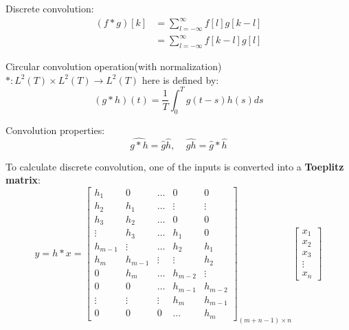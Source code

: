 \documentclass[12pt]{article}
\numberwithin{equation}{section}
\begin{document}
Discrete convolution: 
\begin{align}
	(f * g)[k] &= \sum_{l=-\infty}^\infty f[l] g[k - l] \\
			&= \sum_{l=-\infty}^\infty f[k-l] g[l]
\end{align} \par

Circular convolution operation(with normalization) $*:L^2(T) \times L^2(T) \rightarrow L^2(T)$ here is defined by:
\begin{equation} \label{eq:circonv}
	 (g * h)(t) = \frac{1}{T} \int^{T}_{0} g(t-s) h(s) ds
\end{equation} \par
Convolution properties: 
\begin{equation}\label{eq:convprop}
	 \widehat{g*h}=\hat{g}\hat{h},\ \ \ \ \  \widehat{gh}=\hat{g}*\hat{h}
\end{equation} \par
To calculate discrete convolution, one of the inputs is converted into a \textbf{Toeplitz matrix}:
\begin{equation} \label{eq:convToep}
 y = h \ast x =
            \begin{bmatrix}
                h_1 & 0 & \ldots & 0 & 0 \\
                h_2 & h_1 & \ldots & \vdots & \vdots \\
                h_3 & h_2 & \ldots & 0 & 0 \\
                \vdots & h_3 & \ldots & h_1 & 0 \\
                h_{m-1} & \vdots & \ldots & h_2 & h_1 \\
                h_m & h_{m-1} & \vdots & \vdots & h_2 \\
                0 & h_m & \ldots & h_{m-2} & \vdots \\
                0 & 0 & \ldots & h_{m-1} & h_{m-2} \\
                \vdots & \vdots & \vdots & h_m & h_{m-1} \\
                0 & 0 & 0 & \ldots & h_m
            \end{bmatrix}_{(m+n-1) \times n}
            \begin{bmatrix}
                x_1 \\
                x_2 \\
                x_3 \\
                \vdots \\
                x_n
            \end{bmatrix}
\end{equation}
\end{document}
